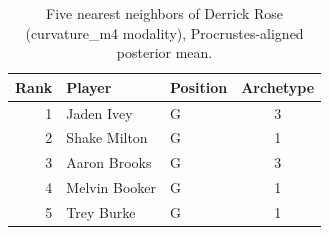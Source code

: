\begin{table}[htbp]
  \centering\small
  \begin{tabular}{rllc}
    \toprule
    Rank & Player & Position & Archetype \\
    \midrule
    1 & Jaden Ivey & G & 3 \\
    2 & Shake Milton & G & 1 \\
    3 & Aaron Brooks & G & 3 \\
    4 & Melvin Booker & G & 1 \\
    5 & Trey Burke & G & 1 \\
    \bottomrule
  \end{tabular}
  \caption{Five nearest neighbors of Derrick Rose (curvature_m4 modality), Procrustes-aligned posterior mean.}
  \label{tab:Derrick_Rose_neighbors_curvature_m4}
\end{table}

